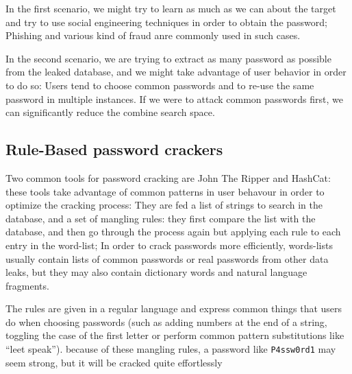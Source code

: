 \documentclass[a4paper,11pt]{article}
\begin{document}
In the first scenario, we might try to learn as much as we can about the target and try to use social engineering techniques in order to obtain the password; Phishing and various kind of fraud anre commonly used in such cases.

In the second scenario, we are trying to extract as many password as possible from the leaked database, and we might take advantage of user behavior in order to do so: Users tend to choose common passwords and to re-use the same password in multiple instances. If we were to attack common passwords first, we can significantly reduce the combine search space.

\subsection{Rule-Based password crackers}

Two common tools for password cracking are John The Ripper and HashCat: these tools take advantage of common patterns in user behavour in order to optimize the cracking process: They are fed a list of strings to search in the database, and a set of mangling rules: they first compare the list with the database, and then go through the process again but applying each rule to each entry in the word-list; In order to crack passwords more efficiently, words-lists usually contain lists of common passwords or real passwords from other data leaks, but they may also contain dictionary words and natural language fragments.

The rules are given in a regular language and express common things that users do when choosing passwords (such as adding numbers at the end of a string, toggling the case of the first letter or perform common pattern substitutions like \enquote{leet speak}). because of these mangling rules, a password like \texttt{P4ssw0rd1} may seem strong, but it will be cracked quite effortlessly

\cleardoublepage
\thispagestyle{empty}
\printbibliography    
\end{document}
